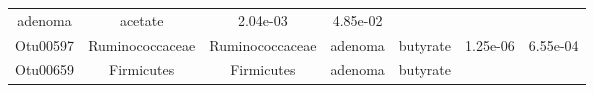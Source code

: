 \documentclass[11pt,]{article}
\begin{document}
\begin{longtable}[]{@{}ccccccc@{}}
\begin{minipage}[t]{0.09\columnwidth}
adenoma\strut
\end{minipage} & \begin{minipage}[t]{0.11\columnwidth}\centering\strut
acetate\strut
\end{minipage} & \begin{minipage}[t]{0.09\columnwidth}\centering\strut
2.04e-03\strut
\end{minipage} & \begin{minipage}[t]{0.09\columnwidth}\centering\strut
4.85e-02\strut
\end{minipage}\tabularnewline
\begin{minipage}[t]{0.09\columnwidth}\centering\strut
Otu00597\strut
\end{minipage} & \begin{minipage}[t]{0.17\columnwidth}\centering\strut
Ruminococcaceae\strut
\end{minipage} & \begin{minipage}[t]{0.17\columnwidth}\centering\strut
Ruminococcaceae\strut
\end{minipage} & \begin{minipage}[t]{0.09\columnwidth}\centering\strut
adenoma\strut
\end{minipage} & \begin{minipage}[t]{0.11\columnwidth}\centering\strut
butyrate\strut
\end{minipage} & \begin{minipage}[t]{0.09\columnwidth}\centering\strut
1.25e-06\strut
\end{minipage} & \begin{minipage}[t]{0.09\columnwidth}\centering\strut
6.55e-04\strut
\end{minipage}\tabularnewline
\begin{minipage}[t]{0.09\columnwidth}\centering\strut
Otu00659\strut
\end{minipage} & \begin{minipage}[t]{0.17\columnwidth}\centering\strut
Firmicutes\strut
\end{minipage} & \begin{minipage}[t]{0.17\columnwidth}\centering\strut
Firmicutes\strut
\end{minipage} & \begin{minipage}[t]{0.09\columnwidth}\centering\strut
adenoma\strut
\end{minipage} & \begin{minipage}[t]{0.11\columnwidth}\centering\strut
butyrate\strut
\end{minipage} & \begin{minipage}[t]{0.09\columnwidth}\centering\strut

\end{minipage}
\end{longtable}
\end{document}
